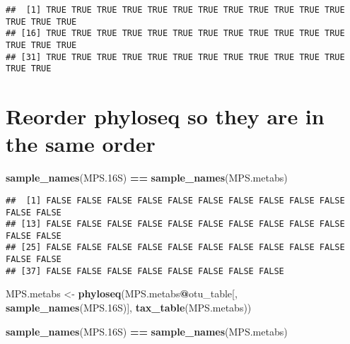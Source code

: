 \documentclass[
]{article}
\newenvironment{Shaded}{\begin{snugshade}}{\end{snugshade}}
\newcommand{\DecValTok}[1]{\textcolor[rgb]{0.00,0.00,0.81}{#1}}
\newcommand{\FloatTok}[1]{\textcolor[rgb]{0.00,0.00,0.81}{#1}}
\newcommand{\FunctionTok}[1]{\textcolor[rgb]{0.13,0.29,0.53}{\textbf{#1}}}
\newcommand{\NormalTok}[1]{#1}
\newcommand{\OtherTok}[1]{\textcolor[rgb]{0.56,0.35,0.01}{#1}}
\newcommand{\SpecialCharTok}[1]{\textcolor[rgb]{0.81,0.36,0.00}{\textbf{#1}}}
\begin{document}
\begin{verbatim}
##  [1] TRUE TRUE TRUE TRUE TRUE TRUE TRUE TRUE TRUE TRUE TRUE TRUE TRUE TRUE TRUE
## [16] TRUE TRUE TRUE TRUE TRUE TRUE TRUE TRUE TRUE TRUE TRUE TRUE TRUE TRUE TRUE
## [31] TRUE TRUE TRUE TRUE TRUE TRUE TRUE TRUE TRUE TRUE TRUE TRUE TRUE TRUE
\end{verbatim}

\begin{Shaded}
\end{Shaded}

\hypertarget{reorder-phyloseq-so-they-are-in-the-same-order}{%
\section{Reorder phyloseq so they are in the same
order}\label{reorder-phyloseq-so-they-are-in-the-same-order}}

\begin{Shaded}
\begin{Highlighting}[]
\FunctionTok{sample\_names}\NormalTok{(MPS}\FloatTok{.16}\NormalTok{S) }\SpecialCharTok{==} \FunctionTok{sample\_names}\NormalTok{(MPS.metabs)}
\end{Highlighting}
\end{Shaded}

\begin{verbatim}
##  [1] FALSE FALSE FALSE FALSE FALSE FALSE FALSE FALSE FALSE FALSE FALSE FALSE
## [13] FALSE FALSE FALSE FALSE FALSE FALSE FALSE FALSE FALSE FALSE FALSE FALSE
## [25] FALSE FALSE FALSE FALSE FALSE FALSE FALSE FALSE FALSE FALSE FALSE FALSE
## [37] FALSE FALSE FALSE FALSE FALSE FALSE FALSE FALSE
\end{verbatim}

\begin{Shaded}
\begin{Highlighting}[]
\NormalTok{MPS.metabs }\OtherTok{\textless{}{-}} \FunctionTok{phyloseq}\NormalTok{(MPS.metabs}\SpecialCharTok{@}\NormalTok{otu\_table[, }\FunctionTok{sample\_names}\NormalTok{(MPS}\FloatTok{.16}\NormalTok{S)],}
                       \FunctionTok{tax\_table}\NormalTok{(MPS.metabs))}

\FunctionTok{sample\_names}\NormalTok{(MPS}\FloatTok{.16}\NormalTok{S) }\SpecialCharTok{==} \FunctionTok{sample\_names}\NormalTok{(MPS.metabs)}
\end{Highlighting}
\end{Shaded}
\end{document}

